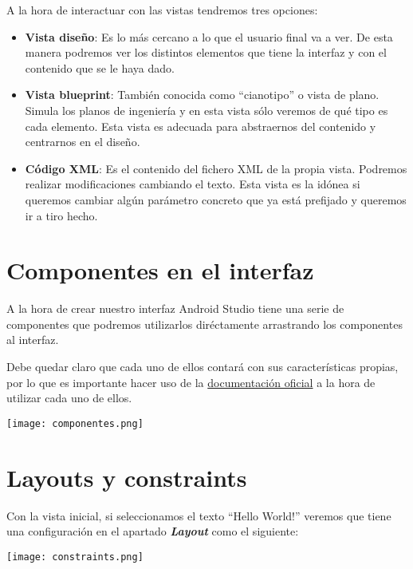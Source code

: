 A la hora de interactuar con las vistas tendremos tres opciones:

\begin{itemize}
    \item \textbf{Vista diseño}: Es lo más cercano a lo que el usuario final va a ver. De esta manera podremos ver los distintos elementos que tiene la interfaz y con el contenido que se le haya dado.

    \item \textbf{Vista blueprint}: También conocida como “cianotipo” o vista de plano. Simula los planos de ingeniería y en esta vista sólo veremos de qué tipo es cada elemento. Esta vista es adecuada para abstraernos del contenido y centrarnos en el diseño.

    \item \textbf{Código XML}: Es el contenido del fichero XML de la propia vista. Podremos realizar modificaciones cambiando el texto. Esta vista es la idónea si queremos cambiar algún parámetro concreto que ya está prefijado y queremos ir a tiro hecho.
\end{itemize}


\section{Componentes en el interfaz}

A la hora de crear nuestro interfaz Android Studio tiene una serie de componentes que podremos utilizarlos diréctamente arrastrando los componentes al interfaz.

Debe quedar claro que cada uno de ellos contará con sus características propias, por lo que es importante hacer uso de la \href{https://developer.android.com/reference/android/widget/EditText}{documentación oficial} a la hora de utilizar cada uno de ellos.

\begin{center}
    \texttt{[image: componentes.png]}
\end{center}

\section{Layouts y constraints}

Con la vista inicial, si seleccionamos el texto “Hello World!” veremos que tiene una configuración en el apartado \textit{\textbf{Layout}} como el siguiente:

\begin{center}
    \texttt{[image: constraints.png]}
\end{center}

